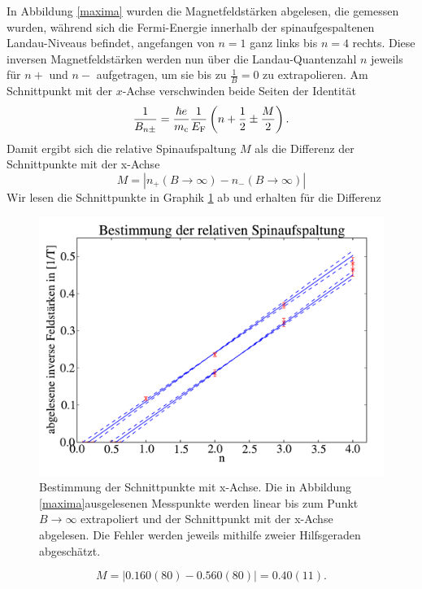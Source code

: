 \documentclass[paper=a4,fontsize=10pt,DIV=18,twocolumn,parskip=half]{scrartcl}
\numberwithin{equation}{section}    %
\begin{document}
In Abbildung \ref{maxima} wurden die Magnetfeldstärken abgelesen, die gemessen wurden, während sich die Fermi-Energie innerhalb der spinaufgespaltenen Landau-Niveaus befindet, angefangen von $n=1$ ganz links bis $n=4$ rechts. Diese inversen Magnetfeldstärken werden nun über die Landau-Quantenzahl $n$ jeweils für $n+$ und $n-$ aufgetragen, um sie bis zu $\frac{1}{B}=0$ zu extrapolieren. Am Schnittpunkt mit der $x$-Achse verschwinden beide Seiten der Identität
\begin{equation}
\frac{1}{B_{n\pm}}=\frac{\hbar e}{m_{\rm c}}\frac{1}{E_{\rm F}}\left(n+\frac{1}{2}\pm\frac{M}{2}\right).
\end{equation}
Damit ergibt sich die relative Spinaufspaltung $M$ als die Differenz der Schnittpunkte mit der x-Achse
\begin{equation}
M=|n_+(B\rightarrow \infty)- n_-(B\rightarrow \infty)|
\end{equation}
Wir lesen die Schnittpunkte in Graphik \ref{spinaufspaltung} ab und erhalten für die Differenz
\begin{figure}[]
	\begin{center}
		\includegraphics[width=\columnwidth]{Data-Plots/07-Spinaufspaltung.pdf}
		\caption{Bestimmung der Schnittpunkte mit x-Achse. Die in Abbildung \ref{maxima}ausgelesenen Messpunkte werden linear bis zum Punkt $B\rightarrow \infty$ extrapoliert und der Schnittpunkt mit der x-Achse abgelesen. Die Fehler werden jeweils mithilfe zweier Hilfsgeraden abgeschätzt.}
		\label{spinaufspaltung}
	\end{center}
\end{figure}
\begin{equation}
M=|0.160(80)-0.560(80)|=0.40(11).
\end{equation}
\end{document}
